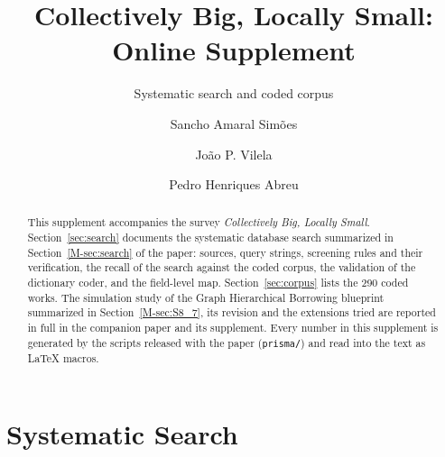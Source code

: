 \documentclass[acmsmall,screen,nonacm]{acmart}
\theoremstyle{acmdefinition}
\begin{document}
\title{Collectively Big, Locally Small: Online Supplement}
\subtitle{Systematic search and coded corpus}

\author{Sancho Amaral Sim\~{o}es}

\author{Jo\~{a}o P. Vilela}

\author{Pedro Henriques Abreu}

\begin{abstract}
This supplement accompanies the survey \emph{Collectively Big, Locally Small}. Section~\ref{sec:search} documents the systematic database search summarized in Section~\ref{M-sec:search} of the paper: sources, query strings, screening rules and their verification, the recall of the search against the coded corpus, the validation of the dictionary coder, and the field-level map. Section~\ref{sec:corpus} lists the 290 coded works. The simulation study of the Graph Hierarchical Borrowing blueprint summarized in Section~\ref{M-sec:S8_7}, its revision and the extensions tried are reported in full in the companion paper \cite{simoes2026ghb} and its supplement. Every number in this supplement is generated by the scripts released with the paper (\texttt{prisma/}) and read into the text as LaTeX macros.
\end{abstract}

\maketitle
\renewcommand{\shortauthors}{Sim\~{o}es et al.}

\section{Systematic Search}\label{sec:search}
\end{document}
